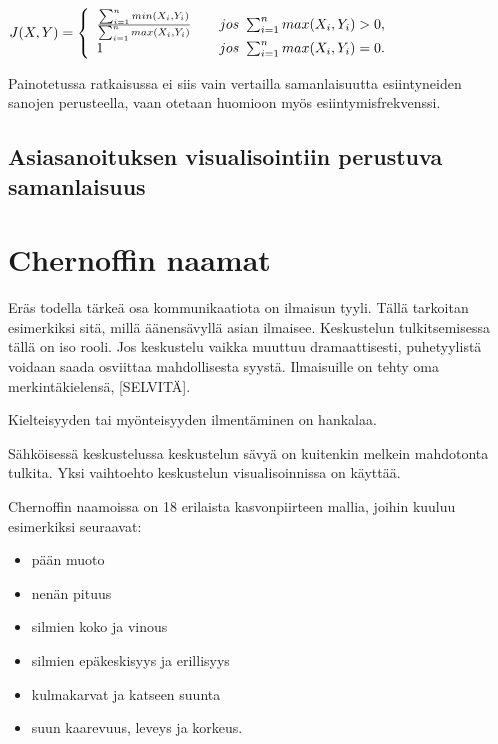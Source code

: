 \documentclass[11pt,a4paper,oneside]{memoir}
\begin{document}
\begin{math}
  J(X, Y) = \left\{ 
  \begin{array}{l l}
	\frac{\sum^n_{i=1} min(X_i, Y_i)}{\sum^n_{i=1} max(X_i, Y_i)} & \quad \text{$jos$ } \sum^n_{i=1} max(X_i, Y_i) > 0,\\
	1 & \quad \text{$jos$ } \sum^n_{i=1} max(X_i, Y_i) = 0.\\	
  \end{array} \right.
\end{math}

Painotetussa ratkaisussa ei siis vain vertailla samanlaisuutta esiintyneiden sanojen perusteella, vaan otetaan huomioon myös esiintymisfrekvenssi.

\subsection{Asiasanoituksen visualisointiin perustuva samanlaisuus}


\section{Chernoffin naamat}
Eräs todella tärkeä osa kommunikaatiota on ilmaisun tyyli. Tällä tarkoitan esimerkiksi sitä, millä äänensävyllä asian ilmaisee. Keskustelun tulkitsemisessa tällä on iso rooli. Jos keskustelu vaikka muuttuu dramaattisesti, puhetyylistä voidaan saada osviittaa mahdollisesta syystä. Ilmaisuille on tehty oma merkintäkielensä, [SELVITÄ].

Kielteisyyden tai myönteisyyden ilmentäminen on hankalaa.

Sähköisessä keskustelussa keskustelun sävyä on kuitenkin melkein mahdotonta tulkita. Yksi vaihtoehto keskustelun visualisoinnissa on käyttää.

Chernoffin naamoissa on 18 erilaista kasvonpiirteen mallia, joihin kuuluu esimerkiksi seuraavat:
\begin{itemize}
\item{pään muoto}
\item{nenän pituus}
\item{silmien koko ja vinous}
\item{silmien epäkeskisyys ja erillisyys}
\item{kulmakarvat ja katseen suunta}
\item{suun kaarevuus, leveys ja korkeus.}
\end{itemize}
\end{document}
